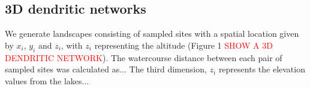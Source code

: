 \documentclass[12pt]{article}
\newcommand{\carlos}[1]{\textcolor{Red}{#1}}
\begin{document}

\subsection{3D dendritic networks}

We generate landscapes consisting of sampled sites with a
spatial location given by $x_{i}$, $y_{i}$ and $z_{i}$, with $z_{i}$
representing the altitude (Figure 1 \carlos{SHOW A 3D DENDRITIC NETWORK}). The
watercourse distance between each pair of sampled sites was calculated as... The third dimension, $z_{i}$ represents the elevation values from the lakes...
\end{document}
